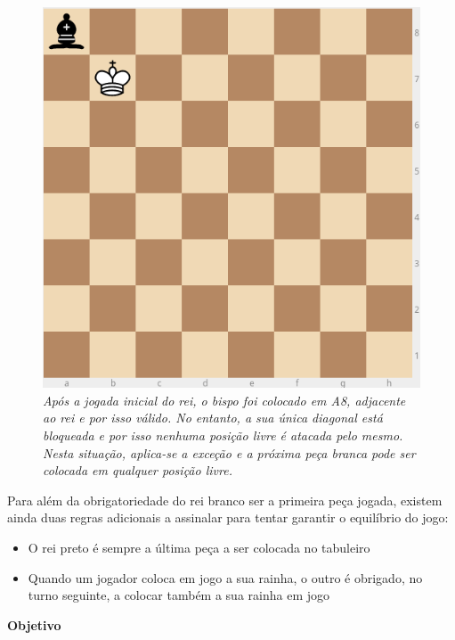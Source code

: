 \documentclass[a4paper]{article}
\begin{document}
\begin{tiny}
\begin{figure}[H]
\begin{center}
\includegraphics[scale=0.25]{board4.png}
\caption{\textit{Após a jogada inicial do rei, o bispo foi colocado em A8, adjacente ao rei e por isso válido. No entanto, a sua única diagonal está bloqueada e por isso nenhuma posição livre é atacada pelo mesmo. Nesta situação, aplica-se a exceção e a próxima peça branca pode ser colocada em qualquer posição livre.}}
\label{fig:fig4}
\end{center}
\end{figure}
\end{tiny}


Para além da obrigatoriedade do rei branco ser a primeira peça jogada, existem ainda duas regras adicionais a assinalar para tentar garantir o equilíbrio do jogo:
\begin{itemize}
    \item O rei preto é sempre a última peça a ser colocada no tabuleiro
    \item Quando um jogador coloca em jogo a sua rainha, o outro é obrigado, no turno seguinte, a colocar também a sua rainha em jogo
\end{itemize}

\textbf{Objetivo}\newline
\end{document}
